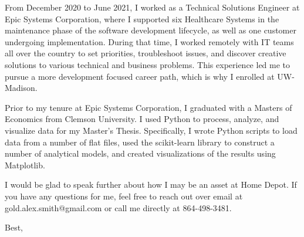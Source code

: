 \documentclass[a4paper, 10pt]{letter}
\begin{document}
\begin{letter}
			From December 2020 to June 2021, I worked as a Technical Solutions Engineer at Epic Systems Corporation, where I supported six Healthcare Systems in the maintenance phase of the software development lifecycle, as well as one customer undergoing implementation. During that time, I worked remotely with IT teams all over the country to set priorities, troubleshoot issues, and discover creative solutions to various technical and business problems. This experience led me to pursue a more development focused career path, which is why I enrolled at UW-Madison.

			Prior to my tenure at Epic Systems Corporation, I graduated with a Masters of Economics from Clemson University. I used Python to process, analyze, and visualize data for my Master’s Thesis. Specifically, I wrote Python scripts to load data from a number of flat files, used the scikit-learn library to construct a number of analytical models, and created visualizations of the results using Matplotlib.

			I would be glad to speak further about how I may be an asset at Home Depot. If you have any questions for me, feel free to reach out over email at gold.alex.smith@gmail.com or call me directly at 864-498-3481. 
		    \closing{Best,}

		    \end{letter}
		    
\end{document}
